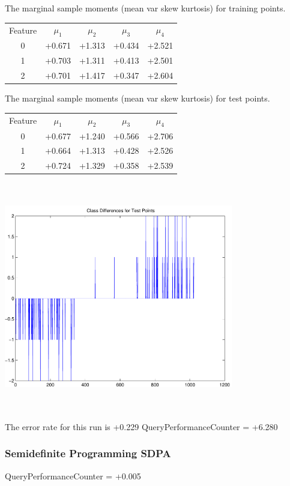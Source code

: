 \documentclass[9pt]{article}
\theoremstyle{plain}
\theoremstyle{definition}
\theoremstyle{remark}
\numberwithin{equation}{section}
\begin{document}
The marginal sample moments (mean var skew kurtosis) for training points.\newline
\begin{tabular}{ c |  c  c  c  c}
Feature & $\mu_1$ & $\mu_2$ & $\mu_3$ & $\mu_4$ \\
0 & +0.671 & +1.313 & +0.434& +2.521 \\
\hline
1 & +0.703 & +1.311 & +0.413& +2.501 \\
\hline
2 & +0.701 & +1.417 & +0.347& +2.604 \\
\hline
\end{tabular}
\newline
The marginal sample moments (mean var skew kurtosis) for test points.\newline
\begin{tabular}{ c | c  c  c  c}
Feature & $\mu_1$ & $\mu_2$ & $\mu_3$ & $\mu_4$ \\
0 & +0.677 & +1.240 & +0.566& +2.706\\
\hline
1 & +0.664 & +1.313 & +0.428& +2.526\\
\hline
2 & +0.724 & +1.329 & +0.358& +2.539\\
\hline
\end{tabular}\newline
\includegraphics[width=10.0cm,height=10.0cm]{classDiffs.pdf}

The error rate for this run is +0.229\newline
QueryPerformanceCounter  =  +6.280
\subsubsection{Semidefinite Programming SDPA}
QueryPerformanceCounter  =  +0.005
\end{document}
